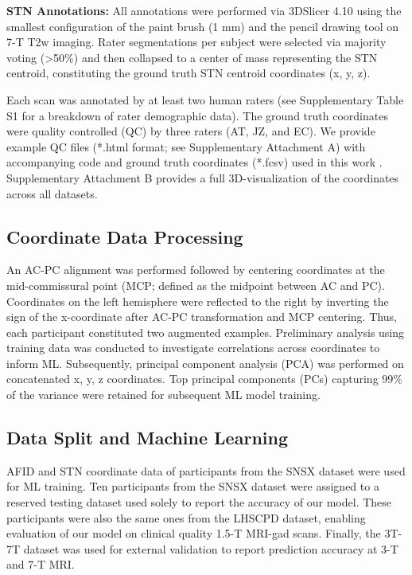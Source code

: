 \textbf{STN Annotations:} All annotations were performed via 3DSlicer 4.10 \cite{ref} using the smallest configuration of the paint brush (1 mm) and the pencil drawing tool on 7-T T2w imaging. Rater segmentations per subject were selected via majority voting (>50\%) and then collapsed to a center of mass representing the STN centroid, constituting the ground truth STN centroid coordinates (x, y, z).

Each scan was annotated by at least two human raters (see Supplementary Table S1 for a breakdown of rater demographic data). The ground truth coordinates were quality controlled (QC) by three raters (AT, JZ, and EC). We provide example QC files (*.html format; see Supplementary Attachment A) with accompanying code and ground truth coordinates (*.fcsv) used in this work \cite{ref}. Supplementary Attachment B provides a full 3D-visualization of the coordinates across all datasets.

\subsection{Coordinate Data Processing}
An AC-PC alignment was performed followed by centering coordinates at the mid-commissural point (MCP; defined as the midpoint between AC and PC). Coordinates on the left hemisphere were reflected to the right by inverting the sign of the x-coordinate after AC-PC transformation and MCP centering. Thus, each participant constituted two augmented examples. Preliminary analysis using training data was conducted to investigate correlations across coordinates to inform ML. Subsequently, principal component analysis (PCA) was performed on concatenated x, y, z coordinates. Top principal components (PCs) capturing 99\% of the variance were retained for subsequent ML model training.

\subsection{Data Split and Machine Learning}
AFID and STN coordinate data of participants from the SNSX dataset were used for ML training. Ten participants from the SNSX dataset were assigned to a reserved testing dataset used solely to report the accuracy of our model. These participants were also the same ones from the LHSCPD dataset, enabling evaluation of our model on clinical quality 1.5-T MRI-gad scans. Finally, the 3T-7T dataset was used for external validation to report prediction accuracy at 3-T and 7-T MRI.

